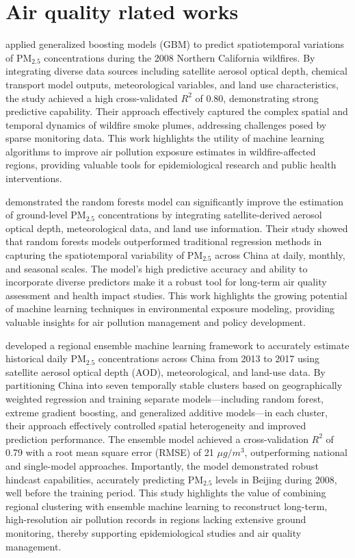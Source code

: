 \documentclass[11pt]{article}
\begin{document}
\section{Air quality rlated works}
\citet{reid2015spatiotemporal} applied generalized boosting models (GBM) to predict spatiotemporal variations of PM$_{2.5}$ concentrations during the 2008 Northern California wildfires. By integrating diverse data sources including satellite aerosol optical depth, chemical transport model outputs, meteorological variables, and land use characteristics, the study achieved a high cross-validated $R^{2}$ of 0.80, demonstrating strong predictive capability. Their approach effectively captured the complex spatial and temporal dynamics of wildfire smoke plumes, addressing challenges posed by sparse monitoring data. This work highlights the utility of machine learning algorithms to improve air pollution exposure estimates in wildfire-affected regions, providing valuable tools for epidemiological research and public health interventions.

\citet{chen2018machine} demonstrated the random forests model can significantly improve the estimation of ground-level PM$_{2.5}$ concentrations by integrating satellite-derived aerosol optical depth, meteorological data, and land use information. Their study showed that random forests models outperformed traditional regression methods in capturing the spatiotemporal variability of PM$_{2.5}$ across China at daily, monthly, and seasonal scales. The model’s high predictive accuracy and ability to incorporate diverse predictors make it a robust tool for long-term air quality assessment and health impact studies. This work highlights the growing potential of machine learning techniques in environmental exposure modeling, providing valuable insights for air pollution management and policy development.

\citet{xiao2018ensemble} developed a regional ensemble machine learning framework to accurately estimate historical daily PM$_{2.5}$ concentrations across China from 2013 to 2017 using satellite aerosol optical depth (AOD), meteorological, and land-use data. By partitioning China into seven temporally stable clusters based on geographically weighted regression and training separate models—including random forest, extreme gradient boosting, and generalized additive models—in each cluster, their approach effectively controlled spatial heterogeneity and improved prediction performance. The ensemble model achieved a cross-validation \(R^2\) of 0.79 with a root mean square error (RMSE) of 21 \(\mu g/m^3\), outperforming national and single-model approaches. Importantly, the model demonstrated robust hindcast capabilities, accurately predicting PM$_{2.5}$ levels in Beijing during 2008, well before the training period. This study highlights the value of combining regional clustering with ensemble machine learning to reconstruct long-term, high-resolution air pollution records in regions lacking extensive ground monitoring, thereby supporting epidemiological studies and air quality management.
\end{document}

